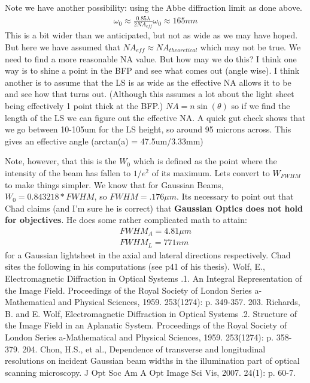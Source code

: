 Note we have another possibility: using the Abbe diffraction limit as done above.
\begin{gather}
    \omega_0 \approx \frac{0.85 \lambda}{2 NA_{eff}}
    \omega_0 \approx 165nm
\end{gather}
This is a bit wider than we anticipated, but not as wide as we may have hoped. But here we have assumed that $NA_{eff} \approx NA_{theoretical}$ which may not be true. We need to find a more reasonable NA value. But how may we do this? I think one way is to shine a point in the BFP and see what comes out (angle wise). I think another is to assume that the LS is as wide as the effective NA allows it to be and see how that turns out. (Although this assumes a lot about the light sheet being effectively 1 point thick at the BFP.)
$NA = n\sin(\theta)$ so if we find the length of the LS we can figure out the effective NA. A quick gut check shows that we go between 10-105um for the LS height, so around 95 microns across. This gives an effective angle (arctan(a) = 47.5um/3.33mm)



Note, however, that this is the $W_0$ which is defined as the point where the intensity of the beam has fallen to $1/e^2$ of its maximum. Lets convert to $W_{FWHM}$ to make things simpler. We know that for Gaussian Beams, $W_0=0.843218*FWHM$, so $FWHM = .176\mu m$.
Its necessary to point out that Chad claims (and I'm sure he is correct) that \textbf{Gaussian Optics does not hold for objectives}. He does some rather complicated math to attain:
\begin{gather}
    FWHM_A=4.81 \mu m\\
    FWHM_L = 771nm
\end{gather}
for a Gaussian lightsheet in the axial and lateral directions respectively.
Chad sites the following in his computations (see p41 of his thesis).
    Wolf, E., Electromagnetic Diffraction in Optical Systems .1. An Integral Representation of the Image Field. Proceedings of the Royal Society of London Series a-Mathematical and Physical Sciences, 1959. 253(1274): p. 349-357.
203. Richards, B. and E. Wolf, Electromagnetic Diffraction in Optical Systems .2. Structure of the Image Field in an Aplanatic System. Proceedings of the Royal Society of London Series a-Mathematical and Physical Sciences, 1959. 253(1274): p. 358-379.
204. Chon, H.S., et al., Dependence of transverse and longitudinal resolutions on incident Gaussian beam widths in the illumination part of optical scanning microscopy. J Opt Soc Am A Opt Image Sci Vis, 2007. 24(1): p. 60-7.

